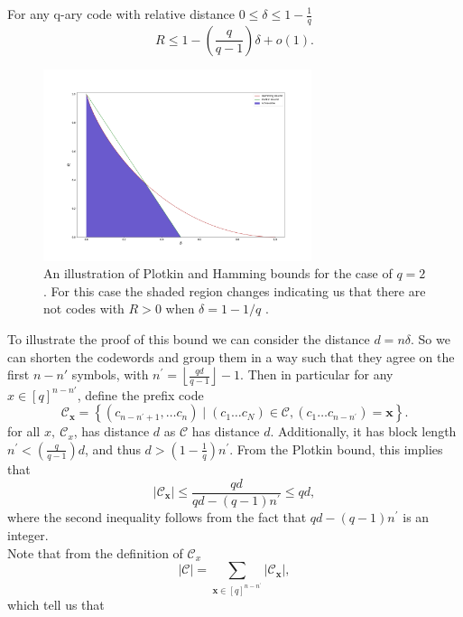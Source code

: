 \begin{definition}
For any q-ary code with relative distance $0 \leq \delta \leq 1-\frac{1}{q}$
\begin{equation}
R \leq 1-\left(\frac{q}{q-1}\right) \delta+o(1).
\label{CH2:Plotkin_bound}
\end{equation}
\end{definition}

\begin{figure}
\centering
\includegraphics[width=0.7\textwidth]{Figures/Hamming_plotkin_bound.png}
\caption{An illustration of Plotkin and Hamming bounds for the case of $q=2$.  For this case the shaded region changes indicating us that there are not codes with $R>0$ when $\delta=1-1/q$ .}
\end{figure}

To illustrate the proof of this bound we can consider the distance $d=n\delta$. So we can shorten the codewords and group them in a way such that they agree on the first $n-n'$ symbols, with $n^{\prime}=\left\lfloor\frac{q d}{q-1}\right\rfloor-1$. Then in particular for any $x\in [q]^{n-n'}$, define the prefix code
\begin{equation}
\mathcal{C}_{\mathbf{x}}=\left\{\left(c_{n-n^{\prime}+1}, \ldots c_{n}\right) \mid\left(c_{1} \ldots c_{N}\right) \in \mathcal{C},\left(c_{1} \ldots c_{n-n^{\prime}}\right)=\mathbf{x}\right\}.
\end{equation}
for all $x,\ \mathcal{C}_{x}$, has distance $d$ as $\mathcal{C}$ has distance $d$. Additionally, it has block length $n^{\prime}<\left(\frac{q}{q-1}\right) d$, and thus $d>\left(1-\frac{1}{q}\right) n^{\prime}$. From the Plotkin bound, this implies that
\begin{equation}
\left|\mathcal{C}_{\mathbf{x}}\right| \leq \frac{q d}{q d-(q-1) n^{\prime}} \leq q d,
\end{equation}
where the second inequality follows from the fact that $q d-(q-1) n^{\prime}$ is an integer.\\
Note that from the definition of $\mathcal{C}_{x}$
\begin{equation}
|\mathcal{C}|=\sum_{\mathbf{x} \in[q]^{n-n^{\prime}}}\left|\mathcal{C}_{\mathbf{x}}\right|,
\end{equation}
which tell us that 


